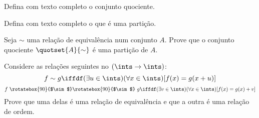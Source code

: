 \begin{exercise}
    Defina com texto completo o conjunto quociente.
\end{exercise}

\begin{exercise}
    Defina com texto completo o que é uma partição. 
\end{exercise}

\begin{exercise}
    Seja $\sim$ uma relação de equivalência num conjunto $A$. Prove que o conjunto quociente $\quotset{A}{\sim}$ é uma partição de $A$.
\end{exercise}

\begin{exercise}
    Considere as relações seguintes no $(\ints \to \ints)$:
    $$
    f \sim g \iffdf (\exists u \in \ints)(\forall x \in \ints)[f(x) = g(x + u)]
    $$
    $$
    f \text{ } \rotatebox{90} {$\sim$} \rotatebox{90} {$\sim$} \text{ } g \iffdf (\exists v \in \ints)(\forall x \in \ints)[f(x) = g(x) + v]
    $$
    Prove que uma delas é uma relação de equivalência e que a outra é uma relação de ordem.
\end{exercise}
